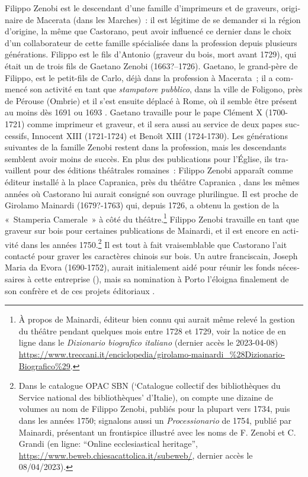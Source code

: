 \documentclass[output=paper,colorlinks,citecolor=brown,arabicfont,chinesefont,booklanguage=french]{langscibook}
\begin{document}
\begin{otherlanguage}{french}
Filippo Zenobi est le descendant d’une famille d’imprimeurs et de graveurs, originaire de Macerata (dans les Marches)~: il est légitime de se demander si la région d'origine, la même que Castorano, peut avoir influencé ce dernier dans le choix d’un collaborateur de cette famille spécialisée dans la profession depuis plusieurs générations. Filippo est le fils d’Antonio (graveur du bois, mort avant 1729), qui était un de trois fils de Gaetano Zenobi (1663?--1726). Gaetano, le grand-père de Filippo, est le petit-fils de Carlo, déjà dans la profession à Macerata~; il a commencé son activité en tant que \emph{stampatore pubblico}, dans la ville de Foligono, près de Pérouse (Ombrie) et il s’est ensuite déplacé à Rome, où il semble être présent au moins dès 1691 ou 1693 \citep[3]{Marinellinodate}. Gaetano travaille pour le pape Clément X (1700-1721) comme imprimeur et graveur, et il sera aussi au service de deux papes successifs, Innocent XIII (1721-1724) et Benoît XIII (1724-1730). Les générations suivantes de la famille Zenobi restent dans la profession, mais les descendants semblent avoir moins de succès. En plus des publications pour l'Église, ils travaillent pour des éditions théâtrales romaines~:  Filippo Zenobi apparaît comme éditeur installé à la place Capranica, près du théâtre Capranica \citep[139--140]{FranchiSartori2002}, dans les mêmes années où Castorano lui aurait consigné son ouvrage plurilingue. Il est proche de Girolamo Mainardi (1679?-1763) qui, depuis 1726, a obtenu la gestion de la «~Stamperia Camerale~» à côté du théâtre.\footnote{À propos de Mainardi, éditeur bien connu qui aurait même relevé la gestion du théâtre pendant quelques mois entre 1728 et 1729, voir la notice de \citet{Franchi2006} en ligne dans le \emph{Dizionario biografico italiano} (dernier accès le 2023-04-08) \url{https://www.treccani.it/enciclopedia/girolamo-mainardi_\%28Dizionario-Biografico\%29}.} Filippo Zenobi travaille en tant que graveur sur bois pour certaines publications de Mainardi, et il est encore en activité dans les années 1750.\footnote{Dans le catalogue OPAC SBN (‘Catalogue collectif des bibliothèques du Service national des bibliothèques’ d’Italie), on compte une dizaine de volumes au nom de Filippo Zenobi, publiés pour la plupart vers 1734, puis dans les années 1750; signalons aussi un \emph{Processionario} de 1754, publié par Mainardi, présentant un frontispice illustré avec les noms de F. Zenobi et C. Grandi (en ligne: “Online ecclesiastical heritage”, \url{https://www.beweb.chiesacattolica.it/subeweb/}, dernier accès le 08/04/2023).}  Il est tout à fait vraisemblable que Castorano l’ait contacté pour graver les caractères chinois sur bois. Un autre franciscain, Joseph Maria da Evora (1690-1752), aurait initialement aidé pour réunir les fonds nécessaires à cette entreprise (\cites[9]{Franceschi2017}[96]{Civezza1879}), mais sa nomination à Porto l’éloigna finalement de son confrère et de ces projets éditoriaux \citep[179]{Li2017}.

\end{otherlanguage}
\end{document}
